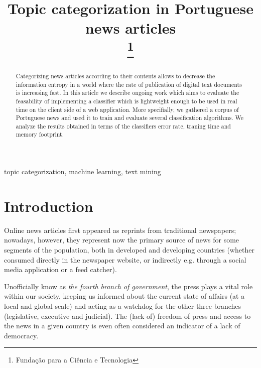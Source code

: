 \documentclass[conference]{IEEEtran}
\begin{document}

\title{Topic categorization in Portuguese news articles\\
\thanks{Fundação para a Ciência e Tecnologia} }


\author{
 }

\maketitle

\begin{abstract} 
Categorizing news articles according to their contents allows to
decrease the information entropy in a world where the rate of
publication of digital text documents is increasing fast. In this
article we describe ongoing work which aims to evaluate the
feasability of implementing a classifier which is lightweight
enough to be used in real time on the client side of a web
application.  More specifially, we gathered a corpus of Portuguese
news and used it to train and evaluate several classification
algorithms. We analyze the results obtained in terms of the
classifiers error rate, traning time and memory footprint.
\end{abstract}

\begin{IEEEkeywords} topic categorization, machine learning, text
mining \end{IEEEkeywords}

\section{Introduction}
Online news articles first appeared as reprints from traditional
newspapers; nowadays, however, they represent now the primary source
of news for some segments of the population, both in developed and
developing countries (whether consumed directly in the newspaper
website, or indirectly e.g. through a social media application or a
feed catcher)\cite{greer2006evolution,boczkowski2005digitizing,chyi1999access}.

Unofficially know as \emph{the fourth branch of government}, the press
plays a vital role within our society, keeping us informed about
the current state of affairs (at a local and global scale) and acting
as a watchdog for the other three branches (legislative, executive and
judicial). The (lack of) freedom of press and access to the news in a
given country is even often considered an indicator of a lack of
democracy\cite{goode2009social,house2009freedom}.
\end{document}
